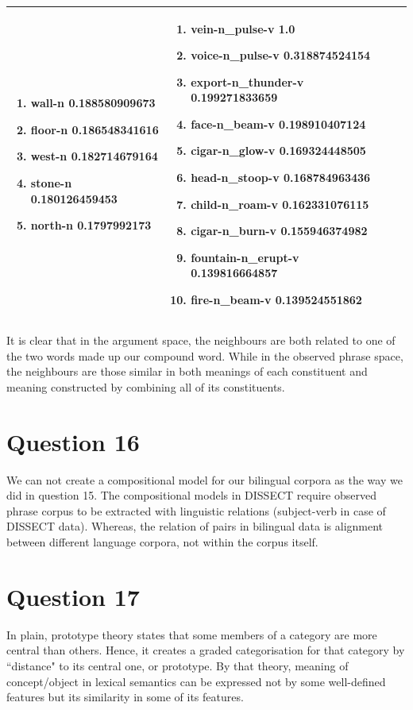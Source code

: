 \documentclass[12pt]{article}
\begin{document}
\begin{longtable}{ p{2cm} | p{5cm} | p{5cm} }
\begin{enumerate}
		\item wall-n 0.188580909673
		\item floor-n 0.186548341616
		\item west-n 0.182714679164
		\item stone-n 0.180126459453
		\item north-n 0.1797992173
	\end{enumerate}
	&
	\begin{enumerate}
        \item vein-n\_pulse-v 1.0
        \item voice-n\_pulse-v 0.318874524154
        \item export-n\_thunder-v 0.199271833659
        \item face-n\_beam-v 0.198910407124
        \item cigar-n\_glow-v 0.169324448505
        \item head-n\_stoop-v 0.168784963436
        \item child-n\_roam-v 0.162331076115
        \item cigar-n\_burn-v 0.155946374982
        \item fountain-n\_erupt-v 0.139816664857
        \item fire-n\_beam-v 0.139524551862
	\end{enumerate}
	\\
	\hline
\end{longtable}

It is clear that in the argument space, the neighbours are both related to one of the two words made up our compound word. While in the observed phrase space, the neighbours are those similar in both meanings of each constituent and meaning constructed by combining all of its constituents.

\section{Question 16}
We can not create a compositional model for our bilingual corpora as the way we did in question 15. The compositional models in DISSECT require observed phrase corpus to be extracted with linguistic relations (subject-verb in case of DISSECT data). Whereas, the relation of pairs in bilingual data is alignment between different language corpora, not within the corpus itself.

\section{Question 17}
In plain, prototype theory states that some members of a category are more central than others. Hence, it creates a graded categorisation for that category by ``distance" to its central one, or prototype. By that theory, meaning of concept/object in lexical semantics can be expressed not by some well-defined features but its similarity in some of its features.
\end{document}
